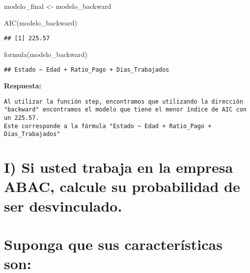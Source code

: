 \documentclass[
]{article}
\newenvironment{Shaded}{\begin{snugshade}}{\end{snugshade}}
\newcommand{\FunctionTok}[1]{\textcolor[rgb]{0.00,0.00,0.00}{#1}}
\newcommand{\NormalTok}[1]{#1}
\newcommand{\OtherTok}[1]{\textcolor[rgb]{0.56,0.35,0.01}{#1}}
\begin{document}
\begin{Shaded}
\begin{Highlighting}[]
\NormalTok{modelo\_final }\OtherTok{\textless{}{-}}\NormalTok{ modelo\_backward}

\FunctionTok{AIC}\NormalTok{(modelo\_backward)}
\end{Highlighting}
\end{Shaded}

\begin{verbatim}
## [1] 225.57
\end{verbatim}

\begin{Shaded}
\begin{Highlighting}[]
\FunctionTok{formula}\NormalTok{(modelo\_backward)}
\end{Highlighting}
\end{Shaded}

\begin{verbatim}
## Estado ~ Edad + Ratio_Pago + Dias_Trabajados
\end{verbatim}

\textbf{Respuesta:}

\begin{verbatim}
Al utilizar la función step, encontramos que utilizando la dirección "backward" encontramos el modelo que tiene el menor índice de AIC con un 225.57. 
Este corresponde a la fórmula "Estado ~ Edad + Ratio_Pago + Dias_Trabajados"
\end{verbatim}

\hypertarget{i-si-usted-trabaja-en-la-empresa-abac-calcule-su-probabilidad-de-ser-desvinculado.}{%
\section{I) Si usted trabaja en la empresa ABAC, calcule su probabilidad
de ser
desvinculado.}\label{i-si-usted-trabaja-en-la-empresa-abac-calcule-su-probabilidad-de-ser-desvinculado.}}

\hypertarget{suponga-que-sus-caracteruxedsticas-son}{%
\section{Suponga que sus características
son:}\label{suponga-que-sus-caracteruxedsticas-son}}
\end{document}

